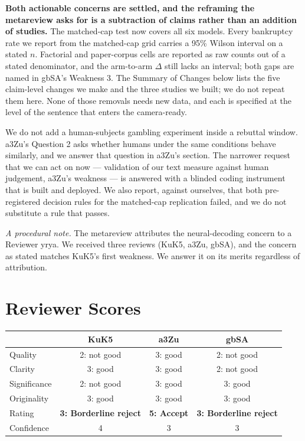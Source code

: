 \documentclass[11pt]{article}
\begin{document}
\textbf{Both actionable concerns are settled, and the reframing the metareview asks for is a
subtraction of claims rather than an addition of studies.} The matched-cap test now covers all
six models. Every bankruptcy rate we report from the matched-cap grid carries a 95\% Wilson
interval on a stated $n$. Factorial and paper-corpus cells are reported as raw counts out of a
stated denominator, and the arm-to-arm $\Delta$ still lacks an interval; both gaps are named in
gbSA's Weakness 3. The Summary of Changes below lists the
five claim-level changes we make and the three studies we built; we do not repeat them here. None of those
removals needs new data, and each is specified at the level of the sentence that enters the
camera-ready.

We do not add a human-subjects gambling experiment inside a rebuttal window. a3Zu's Question 2
asks whether humans under the same conditions behave similarly, and we answer that question in
a3Zu's section. The narrower request that we can act on now --- validation of our text measure
against human judgement, a3Zu's weakness --- is answered with a blinded coding instrument that
is built and deployed. We also report, against ourselves, that both pre-registered decision rules
for the matched-cap replication failed, and we do not substitute a rule that passes.

\textit{A procedural note.} The metareview attributes the neural-decoding concern to a Reviewer
yrya. We received three reviews (KuK5, a3Zu, gbSA), and the concern as stated matches KuK5's
first weakness. We answer it on its merits regardless of attribution.

\section*{Reviewer Scores}

{\small
\centering
\setlength{\tabcolsep}{8pt}
\renewcommand{\arraystretch}{1.05}
\begin{center}
\begin{tabular}{l ccc}
\toprule
& \textbf{KuK5} & \textbf{a3Zu} & \textbf{gbSA} \\
\midrule
Quality       & 2: not good & 3: good & 2: not good \\
Clarity       & 3: good & 3: good & 2: not good \\
Significance  & 2: not good & 3: good & 3: good \\
Originality   & 3: good & 3: good & 3: good \\
Rating        & \textbf{3: Borderline reject} & \textbf{5: Accept} & \textbf{3: Borderline reject} \\
Confidence    & 4 & 3 & 3 \\
\bottomrule
\end{tabular}
\end{center}
}
\end{document}
